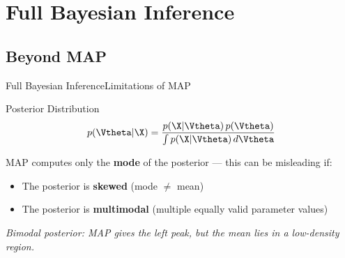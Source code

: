 \section{Full Bayesian Inference}

\subsection{Beyond MAP}

\begin{frame}{Full Bayesian Inference}{Limitations of MAP}
  \begin{block}{Posterior Distribution}
    \[
      p(\Vtheta|\X) = \frac{p(\X|\Vtheta)\,p(\Vtheta)}{\int p(\X|\Vtheta)\,d\Vtheta}
    \]
  \end{block}

  MAP computes only the \textbf{mode} of the posterior — this can be misleading if:
  \begin{itemize}
    \item The posterior is \textbf{skewed} (mode $\ne$ mean)
    \item The posterior is \textbf{multimodal} (multiple equally valid parameter values)
  \end{itemize}

  \begin{center}
  \end{center}
  \small\textit{Bimodal posterior: MAP gives the left peak, but the mean lies in a low-density region.}
\end{frame}


